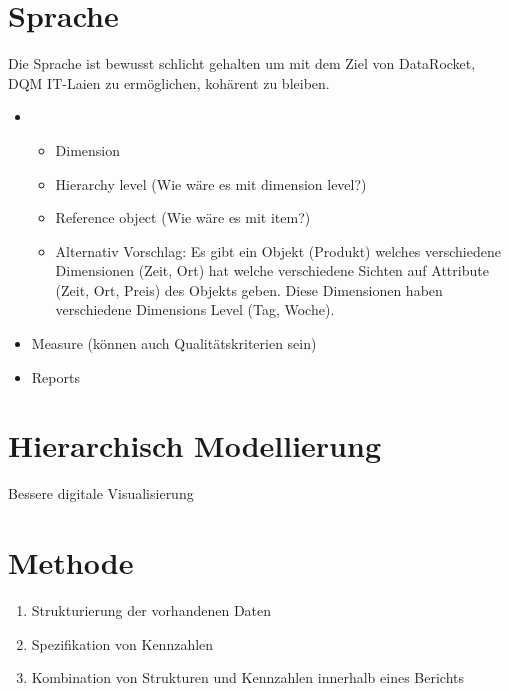 \documentclass[
  language=german, %
  type=bachelor%
]{isthesis}
\begin{document}
\begin{content}
  \section{Sprache}
  \begin{figure}[caption={Metamodell der DataFurnace-Sprache}, label={fig:img01}]
    \resizebox{\columnwidth}{!}{}
  \end{figure}
  Die Sprache ist bewusst schlicht gehalten um mit dem Ziel von DataRocket, \acrshort{DQM}
  IT-Laien zu ermöglichen, kohärent zu bleiben.
  \begin{itemize}
    \item {}
      \begin{itemize}
        \item Dimension
        \item Hierarchy level (Wie wäre es mit dimension level?)
        \item Reference object (Wie wäre es mit item?)
        \item Alternativ Vorschlag: Es gibt ein Objekt (Produkt) welches verschiedene Dimensionen
          (Zeit, Ort) hat welche verschiedene Sichten auf Attribute (Zeit, Ort,
          Preis) des Objekts geben. Diese Dimensionen haben verschiedene
          Dimensions Level (Tag, Woche).
      \end{itemize}
    \item Measure (können auch Qualitätskriterien sein)
    \item Reports 
  \end{itemize}

  \section{Hierarchisch Modellierung}
  Bessere digitale Visualisierung~\citep[][S. 6 f.]{fleischer2013konstruktion}

  \section{Methode}
  \begin{enumerate}
    \item Strukturierung der vorhandenen Daten
    \item Spezifikation von Kennzahlen
    \item Kombination von Strukturen und Kennzahlen innerhalb eines Berichts
  \end{enumerate}



\end{content}
\end{document}
